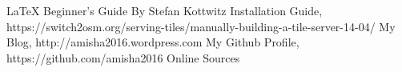 
\begin{thebibliography}{9}
\bibitem{} \LaTeX{} Beginner's Guide By Stefan Kottwitz 
\bibitem{} Installation Guide, https://switch2osm.org/serving-tiles/manually-building-a-tile-server-14-04/
\bibitem{} My Blog, http://amisha2016.wordpress.com
\bibitem{} My Github Profile, https://github.com/amisha2016
\bibitem{} Online Sources
\end{thebibliography}


